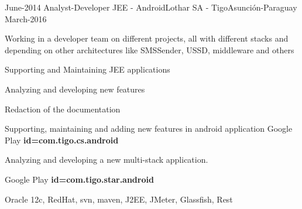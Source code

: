 \begin{experiences}
  \projectexperiences
    {June-2014}   {Analyst-Developer JEE - Android}{Lothar SA - Tigo}{Asunción-Paraguay}
    {March-2016} {

                    Working in a developer team on different projects, all with different stacks and depending on other architectures like SMSSender, USSD, middleware and others}
                {

                        \begin{itemize}
                            \item Supporting and Maintaining JEE applications
                            \item Analyzing and developing new features
                            \item Redaction of the documentation
                            \item Supporting, maintaining and adding new features in android application \tiny{Google Play \textbf{id=com.tigo.cs.android}}
                            \normalsize{\item Analyzing and developing a new multi-stack application.} \tiny{Google Play \textbf{id=com.tigo.star.android}}
                      \end{itemize}

                }
                {Oracle 12c, RedHat, svn, maven, J2EE, JMeter, Glassfish, Rest}
  \emptySeparator


\end{experiences}
